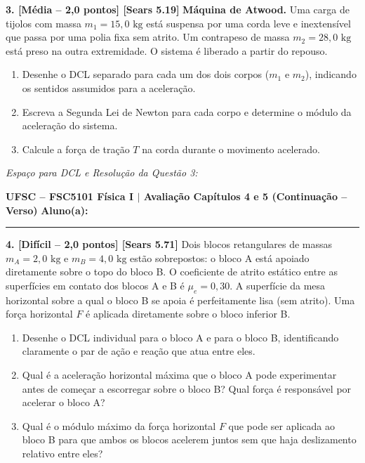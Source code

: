 \documentclass[10pt,a4paper]{article}
\begin{document}
\noindent
\textbf{3. [Média -- 2,0 pontos] [Sears 5.19]} \textbf{Máquina de Atwood.} Uma carga de tijolos com massa $m_1 = 15,0\text{ kg}$ está suspensa por uma corda leve e inextensível que passa por uma polia fixa sem atrito. Um contrapeso de massa $m_2 = 28,0\text{ kg}$ está preso na outra extremidade. O sistema é liberado a partir do repouso.
\begin{enumerate}[label=\alph*),itemsep=0pt,topsep=1pt]
    \item Desenhe o DCL separado para cada um dos dois corpos ($m_1$ e $m_2$), indicando os sentidos assumidos para a aceleração.
    \item Escreva a Segunda Lei de Newton para cada corpo e determine o módulo da aceleração do sistema.
    \item Calcule a força de tração $T$ na corda durante o movimento acelerado.
\end{enumerate}

\vspace{0.15cm}
\noindent\textit{\footnotesize Espaço para DCL e Resolução da Questão 3:}
\vspace{4.5cm}

\newpage

\noindent
\textbf{UFSC -- FSC5101 Física I $\vert$ Avaliação Capítulos 4 e 5 (Continuação -- Verso)} \hfill \textbf{Aluno(a):} \underline{\hspace{5.5cm}}

\vspace{2mm}
\hrule
\vspace{3mm}

\noindent
\textbf{4. [Difícil -- 2,0 pontos] [Sears 5.71]} Dois blocos retangulares de massas $m_A = 2,0\text{ kg}$ e $m_B = 4,0\text{ kg}$ estão sobrepostos: o bloco A está apoiado diretamente sobre o topo do bloco B. O coeficiente de atrito estático entre as superfícies em contato dos blocos A e B é $\mu_e = 0,30$. A superfície da mesa horizontal sobre a qual o bloco B se apoia é perfeitamente lisa (sem atrito). Uma força horizontal $F$ é aplicada diretamente sobre o bloco inferior B.
\begin{enumerate}[label=\alph*),itemsep=0pt,topsep=1pt]
    \item Desenhe o DCL individual para o bloco A e para o bloco B, identificando claramente o par de ação e reação que atua entre eles.
    \item Qual é a aceleração horizontal máxima que o bloco A pode experimentar antes de começar a escorregar sobre o bloco B? Qual força é responsável por acelerar o bloco A?
    \item Qual é o módulo máximo da força horizontal $F$ que pode ser aplicada ao bloco B para que ambos os blocos acelerem juntos sem que haja deslizamento relativo entre eles?
\end{enumerate}
\end{document}
